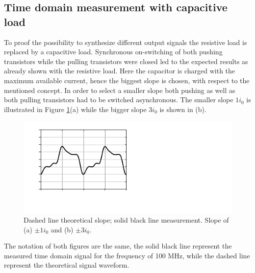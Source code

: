 \documentclass[journal]{IEEEtran}
\begin{document}
\subsection{Time domain measurement with capacitive load}
To proof the possibility to synthesize different output signals the resistive load is replaced by a capacitive load.
Synchronous on-switching of both pushing transistors while the pulling transistors were closed led to the expected results as already shown with the resistive load.
Here the capacitor is charged with the maximum available current, hence the biggest slope is chosen, with respect to the mentioned concept.
In order to select a smaller slope both pushing as well as both pulling transistors had to be switched asynchronous.
The smaller slope $1 i_0$ is illustrated in Figure \ref{fig:meas_Output_CLoad_100M_1io_3io}(a) while the bigger slope $3 i_0$ is shown in (b).

\begin{figure}[htb]
  \centering
  \includegraphics{meas_Output_CLoad_100M_1i0_3i0}
  \caption{
    Dashed line theoretical slope; solid black line measurement. Slope of (a) $\pm 1  i_0$ and (b) $\pm 3 i_0$.}
  \label{fig:meas_Output_CLoad_100M_1io_3io}
\end{figure}
The notation of both figures are the same, the solid black line represent the measured time domain signal for the frequency of 100 MHz, while the dashed line represent the theoretical signal waveform.
\end{document}

